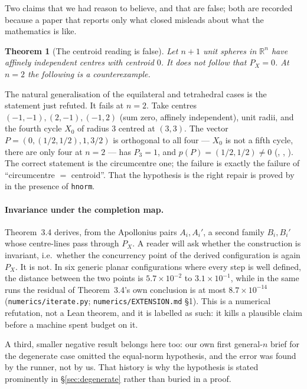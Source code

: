 \documentclass[11pt]{article}
\newtheorem{theorem}{Theorem}
\theoremstyle{definition}
\theoremstyle{remark}
\newcommand{\RR}{\mathbb{R}}
\begin{document}
Two claims that we had reason to believe, and that are false; both are recorded because a paper that
reports only what closed misleads about what the mathematics is like.

\begin{theorem}[The centroid reading is false]\label{thm:negative}
Let $n+1$ unit spheres in $\RR^n$ have affinely independent centres with centroid $0$. It does
\emph{not} follow that $P_X=0$. At $n=2$ the following is a counterexample.
\end{theorem}

\noindent The natural generalisation of the equilateral and tetrahedral cases is the statement just
refuted. It fails at $n=2$. Take centres $(-1,-1),(2,-1),(-1,2)$ (sum zero,
affinely independent), unit radii, and the fourth cycle $X_0$ of radius $3$ centred at $(3,3)$. The
vector $P=(0,(1/2,1/2),1,3/2)$ is orthogonal to all four --- $X_0$ is not a fifth cycle, there are
only four at $n=2$ --- has $P_3=1$, and $p(P)=(1/2,1/2)\neq0$
(, , ). The
correct statement is the circumcentre one; the failure is exactly the failure of
``circumcentre $=$ centroid''. That the hypothesis is the right repair is proved by
 in the presence of \texttt{hnorm}.

\paragraph{Invariance under the completion map.} Theorem~3.4 derives, from the Apollonius pairs
$A_i,A_i'$, a second family $B_i,B_i'$ whose centre-lines pass through $P_X$. A reader will ask
whether the construction is invariant, i.e.\ whether the concurrency point of the derived
configuration is again $P_X$. It is not. In six generic planar configurations where every step is
well defined, the distance between the two points is $5.7\times10^{-2}$ to $3.1\times10^{-1}$, while
in the same runs the residual of Theorem~3.4's own conclusion is at most $8.7\times10^{-14}$
(\texttt{numerics/iterate.py}; \texttt{numerics/EXTENSION.md} \S1). This is a numerical
refutation, not a Lean theorem, and it is labelled as such: it kills a plausible claim before a
machine spent budget on it.

A third, smaller negative result belongs here too: our own first general-$n$ brief for the
degenerate case omitted the equal-norm hypothesis, and the error was found by the runner, not by us.
That history is why the hypothesis is stated prominently in \S\ref{sec:degenerate} rather than
buried in a proof.
\end{document}
